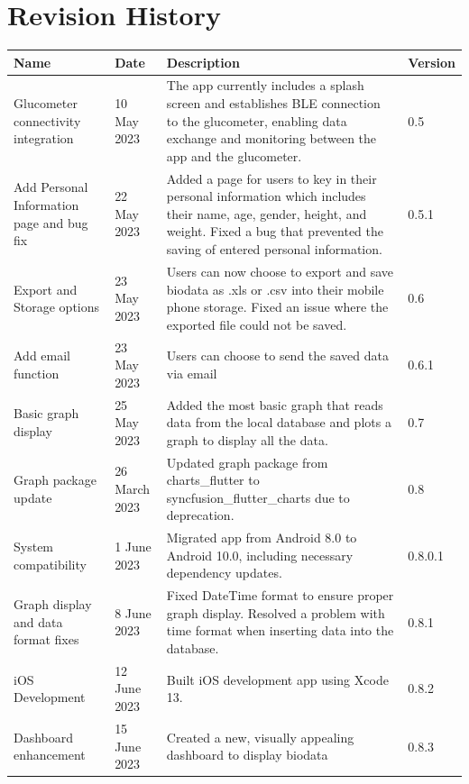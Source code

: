 \documentclass[a4paper]{scrreprt}
\begin{document}
\chapter*{Revision History}
\begin{center}
\begin{longtable}{|p{2.8cm}|l|p{7cm}|l|}
    \hline
    \textbf{Name} & \textbf{Date} & \textbf{Description} & \textbf{Version} \\
    \hline
    Glucometer connectivity integration & 10 May 2023 & The app currently includes a splash screen and establishes BLE connection to the glucometer, enabling data exchange and monitoring between the app and the glucometer. & 0.5 \\
    \hline
    Add Personal Information page and bug fix & 22 May 2023 & Added a page for users to key in their personal information which includes their name, age, gender, height, and weight. Fixed a bug that prevented the saving of entered personal information. & 0.5.1\\
    \hline
    Export and Storage options & 23 May 2023 & Users can now choose to export and save biodata as .xls or .csv into their mobile phone storage. Fixed an issue where the exported file could not be saved. & 0.6 \\
    \hline
    Add email function & 23 May 2023 & Users can choose to send the saved data via email  & 0.6.1\\
    \hline
    Basic graph display & 25 May 2023 & Added the most basic graph that reads data from the local database and plots a graph to display all the data. & 0.7\\
    \hline
    Graph package update & 26 March 2023 & Updated graph package from charts_flutter to syncfusion_flutter_charts due to deprecation. & 0.8\\
    \hline
    System compatibility & 1 June 2023 & Migrated app from Android 8.0 to Android 10.0, including necessary dependency updates. & 0.8.0.1\\
    \hline
    Graph display and data format fixes & 8 June 2023 & Fixed DateTime format to ensure proper graph display. Resolved a problem with time format when inserting data into the database. & 0.8.1\\
    \hline
    iOS Development & 12 June 2023 & Built iOS development app using Xcode 13. & 0.8.2\\
    \hline
    Dashboard enhancement & 15 June 2023 & Created a new, visually appealing dashboard to display biodata & 0.8.3\\

\end{longtable}
\end{center}
\end{document}
